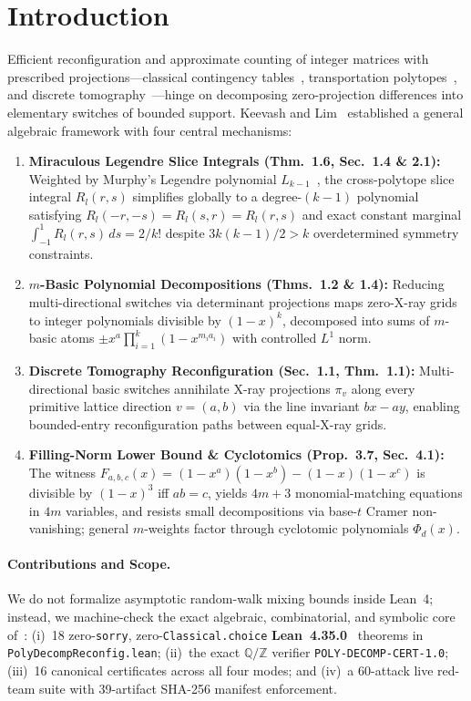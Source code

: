 \documentclass[10pt,twocolumn]{article}
\begin{document}
\section{Introduction}\label{sec:intro}
Efficient reconfiguration and approximate counting of integer matrices with prescribed projections---classical contingency tables~\cite{diaconis1998algebraic,dyer1997sampling,barvinok2010number}, transportation polytopes~\cite{deza2010diameter}, and discrete tomography~\cite{gardner1999discrete,hajdu2001algebraic}---hinge on decomposing zero-projection differences into elementary switches of bounded support. Keevash and Lim~\cite{keevash2026efficient} established a general algebraic framework with four central mechanisms:
\begin{enumerate}[leftmargin=*,nosep]
  \item \textbf{Miraculous Legendre Slice Integrals (Thm.~1.6, Sec.~1.4 \& 2.1):} Weighted by Murphy's Legendre polynomial $L_{k-1}$~\cite{szego1939orthogonal}, the cross-polytope slice integral $R_l(r,s)$ simplifies globally to a degree-$(k-1)$ polynomial satisfying $R_l(-r,-s)=R_l(s,r)=R_l(r,s)$ and exact constant marginal $\int_{-1}^1 R_l(r,s)\,ds = 2/k!$ despite $3k(k-1)/2 > k$ overdetermined symmetry constraints.
  \item \textbf{$m$-Basic Polynomial Decompositions (Thms.~1.2 \& 1.4):} Reducing multi-directional switches via determinant projections maps zero-X-ray grids to integer polynomials divisible by $(1-x)^k$, decomposed into sums of $m$-basic atoms $\pm x^a \prod_{i=1}^k (1-x^{m_i a_i})$ with controlled $L^1$ norm.
  \item \textbf{Discrete Tomography Reconfiguration (Sec.~1.1, Thm.~1.1):} Multi-directional basic switches annihilate X-ray projections $\pi_v$ along every primitive lattice direction $v = (a,b)$ via the line invariant $bx - ay$, enabling bounded-entry reconfiguration paths between equal-X-ray grids.
  \item \textbf{Filling-Norm Lower Bound \& Cyclotomics (Prop.~3.7, Sec.~4.1):} The witness $F_{a,b,c}(x) = (1-x^a)(1-x^b)-(1-x)(1-x^c)$ is divisible by $(1-x)^3$ iff $ab = c$, yields $4m+3$ monomial-matching equations in $4m$ variables, and resists small decompositions via base-$t$ Cramer non-vanishing; general $m$-weights factor through cyclotomic polynomials $\Phi_d(x)$.
\end{enumerate}

\paragraph{Contributions and Scope.}
We do not formalize asymptotic random-walk mixing bounds inside Lean~4; instead, we machine-check the exact algebraic, combinatorial, and symbolic core of~\cite{keevash2026efficient}:
(i)~18 zero-\texttt{sorry}, zero-\texttt{Classical.choice} \textbf{Lean~4.35.0}~\cite{demoura2021lean4} theorems in \texttt{PolyDecompReconfig.lean};
(ii)~the exact $\mathbb{Q}/\mathbb{Z}$ verifier \texttt{POLY-DECOMP-CERT-1.0};
(iii)~16 canonical certificates across all four modes; and
(iv)~a 60-attack live red-team suite with 39-artifact SHA-256 manifest enforcement.
\end{document}
